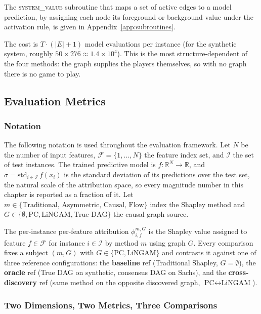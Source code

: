 \documentclass[12pt,a4paper,oneside]{article}
\begin{document}
The \textsc{system\_value} subroutine that maps a set of active edges to a model prediction, by assigning each node its foreground or background value under the activation rule, is given in Appendix~\ref{app:subroutines}.

The cost is $T \cdot (|E| + 1)$ model evaluations per instance (for the synthetic system, roughly $50 \times 276 \approx 1.4 \times 10^4$). This is the most structure-dependent of the four methods: the graph supplies the players themselves, so with no graph there is no game to play.

\subsection{Evaluation Metrics}
\label{sec:metrics}

\subsubsection{Notation}

The following notation is used throughout the evaluation framework. Let $N$ be the number of input features, $\mathcal{F} = \{1,\ldots,N\}$ the feature index set, and $\mathcal{I}$ the set of test instances. The trained predictive model is $f: \mathbb{R}^N \to \mathbb{R}$, and $\hat{\sigma} = \mathrm{std}_{i \in \mathcal{I}}\, f(x_i)$ is the standard deviation of its predictions over the test set, the natural scale of the attribution space, so every magnitude number in this chapter is reported as a fraction of it. Let $m \in \{\text{Traditional, Asymmetric, Causal, Flow}\}$ index the Shapley method and $G \in \{\emptyset, \text{PC}, \text{LiNGAM}, \text{True DAG}\}$ the causal graph source.

The per-instance per-feature attribution $\phi^{m,G}_{i,f}$ is the Shapley value assigned to feature $f \in \mathcal{F}$ for instance $i \in \mathcal{I}$ by method $m$ using graph $G$. Every comparison fixes a subject $(m, G)$ with $G \in \{\text{PC}, \text{LiNGAM}\}$ and contrasts it against one of three reference configurations: the \textbf{baseline} ref (Traditional Shapley, $G = \emptyset$), the \textbf{oracle} ref (True DAG on synthetic, consensus DAG on Sachs), and the \textbf{cross-discovery} ref (same method on the opposite discovered graph, $\text{PC} \leftrightarrow \text{LiNGAM}$).

\subsubsection{Two Dimensions, Two Metrics, Three Comparisons}
\end{document}

